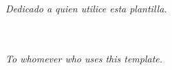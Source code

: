 {
    \raggedleft
    \emph{Dedicado a quien utilice esta plantilla.}


    \ \\
    \ \\

    \emph{To whomever who uses this template.}
    
}